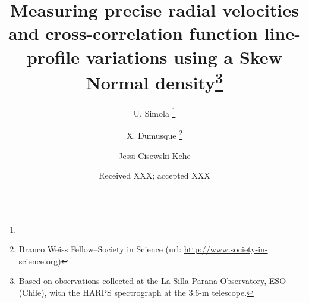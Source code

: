 \documentclass{aa}
\begin{document}
\title{Measuring precise radial velocities and cross-correlation function line-profile variations using a Skew Normal density\thanks{Based on observations collected at the La Silla Parana Observatory,
ESO (Chile), with the HARPS spectrograph at the 3.6-m telescope.}}


\author{U. Simola 
	    \thanks{}
	    \and X. Dumusque
	    \thanks{Branco Weiss Fellow--Society in Science (url: \url{http://www.society-in-science.org})}    
	    \and Jessi Cisewski-Kehe
	    }


\date{Received XXX; accepted XXX}
\end{document}
